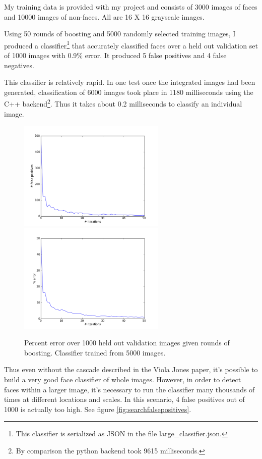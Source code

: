 \documentclass[11pt,twocolumn]{article}
\begin{document}
My training data\cite{trainingdata} is provided with my project and
consists of 3000 images of faces and 10000 images of non-faces. All
are 16 X 16 grayscale images.

Using 50 rounds of boosting and 5000 randomly selected training
images, I produced a classifier\footnote{This classifier is serialized
  as JSON in the file large\_classifier.json.}  that accurately
classified faces over a held out validation set of 1000 images with
0.9\% error. It produced 5 false positives and 4 false negatives.

This classifier is relatively rapid. In one test once the integrated
images had been generated, classification of 6000 images took place in
1180 milliseconds using the C++ backend\footnote{By comparison the
  python backend took 9615 milliseconds.}. Thus it takes about 0.2
milliseconds to classify an individual image.

\begin{figure}
\includegraphics[width=70mm]{false_positives.png}
\includegraphics[width=70mm]{pct_err.png}
\caption{Percent error over 1000 held out validation images given
  rounds of boosting. Classifier trained from 5000 images.}
\label{fig:bootingiter}
\end{figure}



Thus even without the cascade described in the Viola Jones paper,
it's possible to build a very good face classifier of whole
images. However, in order to detect faces within a larger image, it's
necessary to run the classifier many thousands of times at different
locations and scales. In this scenario, 4 false positives out of 1000
is actually too high. See figure \ref{fig:searchfalsepositives}.
\end{document}
